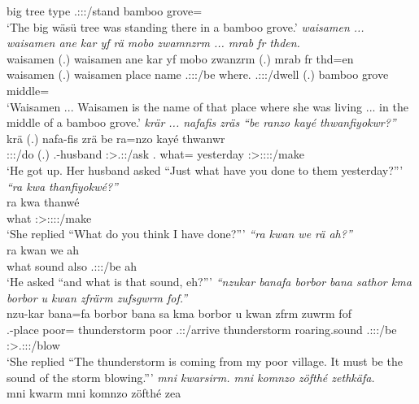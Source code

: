 \begin{exe}
	big {tree type} \Tsg.\Masc:\Sbj:\Pst:\Dur/stand bamboo grove=\Loc\\
	\trans `The big wäsü tree was standing there in a bamboo grove.'
	\emph{waisamen ... waisamen ane kar yf rä mobo zwamnzrm ... mrab fr thden.}\\
	\gll waisamen (.) waisamen ane kar yf  mobo zwanzrm (.) mrab fr thd=en\\
	waisamen (.) waisamen \Dem{} place name \Tsg.\F:\Sbj:\Nonpast:\Ipfv/be where.\All{} \Tsg.\F:\Sbj:\Pst:\Dur/dwell (.) bamboo grove middle=\Loc{}\\
	\trans `Waisamen ... Waisamen is the name of that place where she was living ... in the middle of a bamboo grove.'
	\emph{krär ... nafafis zräs ``be ranzo kayé thwanfiyokwr?''}\\
	\gll krä (.) nafa-fis zrä be ra=nzo kayé thwanwr\\
	\Stsg:\Sbj:\Irr:\Pfv/do (.) \Third.\Poss-husband \Stsg:\Sbj>\Tsg.\F:\Irr:\Pfv/ask \Ssg.\Erg{} what=\Only{} yesterday \Stsg:\Sbj>\Stpl:\Obj:\Rpst:\Ipfv:\Venit/make\\
	\trans `He got up. Her husband asked ``Just what have you done to them yesterday?'''
	\emph{``ra kwa thanfiyokwé?'' }\\
	\gll ra kwa thanwé\\
	what \Fut{} \Fsg:\Sbj>\Stpl:\Obj:\Rpst:\Ipfv:\Venit/make\\
	\trans `She replied ``What do you think I have done?'''
	\emph{``ra kwan we rä ah?''}\\
	\gll ra kwan we  ah\\
	what sound also \Tsg.\F:\Sbj:\Nonpast:\Ipfv/be ah\\
	\trans `He asked ``and what is that sound, eh?'''
	\emph{``nzukar banafa borbor bana sathor kma borbor u kwan zfrärm zufsgwrm fof.''}\\
	\gll nzu-kar bana=fa borbor bana sa kma borbor {u kwan} zfrm zuwrm fof\\
	\Fsg.\Poss-place poor=\Abl{} thunderstorm poor \Tsg.\Masc:\Rpst:\Pfv/arrive \Pot{} thunderstorm {roaring.sound} \Tsg.\F:\Sbj:\Pst:\Dur/be \Sg:\Sbj>\Tsg.\F:\Obj:\Pst:\Dur/blow \Emph\\
	\trans `She replied ``The thunderstorm is coming from my poor village. It must be the sound of the storm blowing.'''
	\emph{mni kwarsirm. mni komnzo zöfthé zethkäfa.}\\
	\gll mni kwarm mni komnzo zöfthé zea\\

\end{exe}
